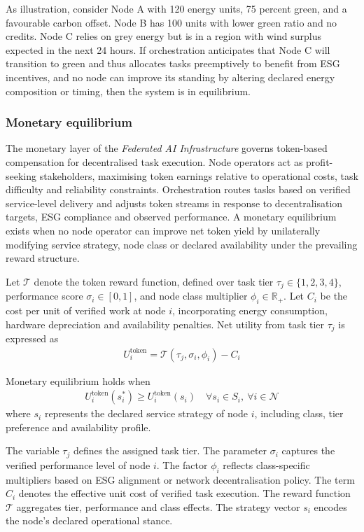 \documentclass[oneside,10pt]{swissi}
\begin{document}
As illustration, consider Node A with 120 energy units, 75 percent green, and a favourable carbon offset. Node B has 100 units with lower green ratio and no credits. Node C relies on grey energy but is in a region with wind surplus expected in the next 24 hours. If orchestration anticipates that Node C will transition to green and thus allocates tasks preemptively to benefit from ESG incentives, and no node can improve its standing by altering declared energy composition or timing, then the system is in equilibrium.

\subsubsection{Monetary equilibrium}

The monetary layer of the \textit{Federated AI Infrastructure} governs token-based compensation for decentralised task execution. Node operators act as profit-seeking stakeholders, maximising token earnings relative to operational costs, task difficulty and reliability constraints. Orchestration routes tasks based on verified service-level delivery and adjusts token streams in response to decentralisation targets, ESG compliance and observed performance. A monetary equilibrium exists when no node operator can improve net token yield by unilaterally modifying service strategy, node class or declared availability under the prevailing reward structure.

Let \( \mathcal{T} \) denote the token reward function, defined over task tier \( \tau_j \in \{1,2,3,4\} \), performance score \( \sigma_i \in [0,1] \), and node class multiplier \( \phi_i \in \mathbb{R}_+ \). Let \( C_i \) be the cost per unit of verified work at node \( i \), incorporating energy consumption, hardware depreciation and availability penalties. Net utility from task tier \( \tau_j \) is expressed as
\begin{align}
U_i^{\text{token}} = \mathcal{T}(\tau_j, \sigma_i, \phi_i) - C_i
\end{align}

Monetary equilibrium holds when
\begin{align}
U_i^{\text{token}}(s_i^*) \ge U_i^{\text{token}}(s_i) \quad \forall s_i \in S_i,\ \forall i \in \mathcal{N}
\end{align}
where \( s_i \) represents the declared service strategy of node \( i \), including class, tier preference and availability profile.

The variable \( \tau_j \) defines the assigned task tier. The parameter \( \sigma_i \) captures the verified performance level of node \( i \). The factor \( \phi_i \) reflects class-specific multipliers based on ESG alignment or network decentralisation policy. The term \( C_i \) denotes the effective unit cost of verified task execution. The reward function \( \mathcal{T} \) aggregates tier, performance and class effects. The strategy vector \( s_i \) encodes the node's declared operational stance.
\end{document}
